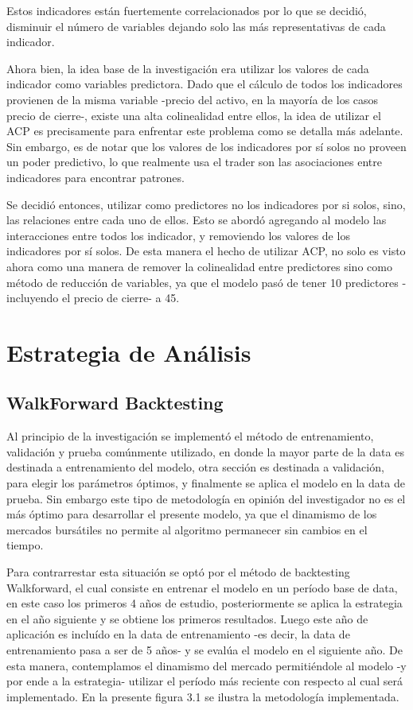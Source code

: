 \documentclass[a4paper,12pt]{Latex/Classes/PhDthesisPSnPDF}
\begin{document}
Estos indicadores están fuertemente correlacionados por lo que se decidió, disminuir el número de variables dejando solo las más representativas de cada indicador.

Ahora bien, la idea base de la investigación era utilizar los valores de cada indicador como variables predictora. Dado que el cálculo de todos los indicadores provienen de la misma variable -precio del activo, en la mayoría de los casos precio de cierre-, existe una alta colinealidad entre ellos, la idea de utilizar el ACP es precisamente para enfrentar este problema como se detalla más adelante. Sin embargo, es de notar que los valores de los indicadores por sí solos no proveen un poder predictivo, lo que realmente usa el trader son las asociaciones entre indicadores para encontrar patrones. 

Se decidió entonces, utilizar como predictores no los indicadores por si solos, sino, las relaciones entre cada uno de ellos. Esto se abordó agregando al modelo las interacciones entre todos los indicador, y removiendo los valores de los indicadores por sí solos. De esta manera el hecho de utilizar ACP, no solo es visto ahora como una manera de remover la colinealidad entre predictores sino como método de reducción de variables, ya que el modelo pasó de tener 10 predictores -incluyendo el precio de cierre- a 45.

\section{Estrategia de Análisis}

\subsection{WalkForward Backtesting}

Al principio de la investigación se implementó el método de entrenamiento, validación y prueba comúnmente utilizado, en donde la mayor parte de la data es destinada a entrenamiento del modelo, otra sección es destinada a validación, para elegir los parámetros óptimos, y finalmente se aplica el modelo en la data de prueba. Sin embargo este tipo de metodología en opinión del investigador no es el más óptimo para desarrollar el presente modelo, ya que el dinamismo de los mercados bursátiles no permite al algoritmo permanecer sin cambios en el tiempo.

Para contrarrestar esta situación se optó por el método de backtesting Walkforward, el cual consiste en entrenar el modelo en un período base de data, en este caso los primeros 4 años de estudio, posteriormente se aplica la estrategia en el año siguiente y se obtiene los primeros resultados. Luego este año de aplicación es incluído en la data de entrenamiento -es decir, la data de entrenamiento pasa a ser de 5 años- y se evalúa el modelo en el siguiente año. De esta manera, contemplamos el dinamismo del mercado permitiéndole al modelo -y por ende a la estrategia- utilizar el período más reciente con respecto al cual será implementado. En la presente figura 3.1 se ilustra la metodología implementada.
\end{document}
